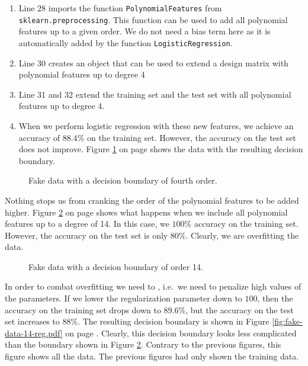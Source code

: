\begin{enumerate}
\item Line 28 imports the function \texttt{PolynomialFeatures} from \texttt{sklearn.preprocessing}.
      This function can be used to add all polynomial features up to a given order.
      We do not need a bias term here as it is automatically added by the function \texttt{LogisticRegression}.
\item Line 30 creates an object that can be used to extend a design matrix with polynomial features up to degree 4
\item Line 31 and 32 extend the training set and the test set with all polynomial features up to degree 4.
\item When we perform logistic regression with these new features, we achieve an accuracy of $88.4\%$ on the
      training set.  However, the accuracy on the test set does not improve.
      Figure \ref{fig:fake-data-quartic.pdf} on page \pageref{fig:fake-data-quartic.pdf} shows the data with
      the resulting decision boundary.
\end{enumerate}

\begin{figure}[!th]
\caption{Fake data with a decision boundary of fourth order.}
\label{fig:fake-data-quartic.pdf}
\end{figure}

Nothing stops us from cranking the order of the polynomial features to be added higher.
Figure \ref{fig:fake-data-14.pdf} on page \pageref{fig:fake-data-14.pdf} shows what happens when we include all
polynomial features up to a degree of 14.  In this case, we $100\%$ accuracy on the training set.  However, the
accuracy on the test set is only $80\%$.  Clearly, we are overfitting the data.

\begin{figure}[!th]
\caption{Fake data with a decision boundary of order 14.}
\label{fig:fake-data-14.pdf}
\end{figure}

In order to combat overfitting we need to , i.e.~we need to penalize high values of the
parameters.  If we lower the regularization parameter down to $100$, then the accuracy on the training set
drops down to $89.6\%$, but the accuracy on the test set increases to $88\%$.  The resulting decision boundary
is shown in Figure \ref{fig:fake-data-14-reg.pdf} on page \pageref{fig:fake-data-14-reg.pdf}.  Clearly, this
decision boundary looks less complicated than the boundary shown in Figure \ref{fig:fake-data-14.pdf}.
Contrary to the previous figures, this figure shows all the data.  The previous figures had only shown the
training data.

